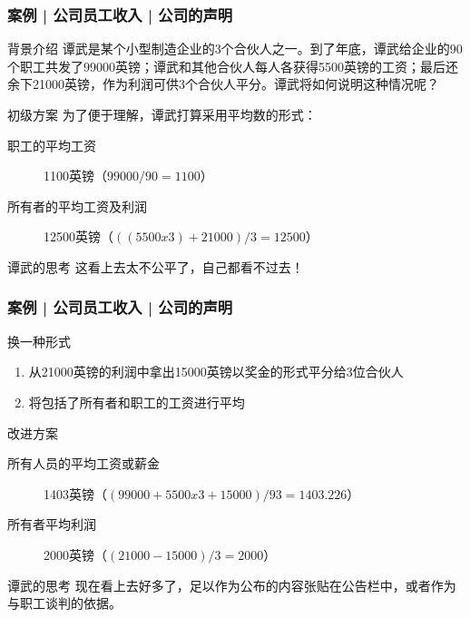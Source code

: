 \begin{frame}
  \frametitle{案例 | 公司员工收入 | 公司的声明}
  \begin{block}{背景介绍}
谭武是某个小型制造企业的3个合伙人之一。到了年底，谭武给企业的90个职工共发了99000英镑；谭武和其他合伙人每人各获得5500英镑的工资；最后还余下21000英镑，作为利润可供3个合伙人平分。谭武将如何说明这种情况呢？
  \end{block}
  \pause \pause \pause \pause
  \begin{block}{初级方案}
    为了便于理解，谭武打算采用平均数的形式：
    \begin{description}
      \item[职工的平均工资] 1100英镑（$99000 / 90 = 1100$）
      \item[所有者的平均工资及利润] 12500英镑（$((5500 x 3) + 21000) / 3 = 12500$）
    \end{description}
  \end{block}
  \pause
  \begin{block}{谭武的思考}
    这看上去太不公平了，自己都看不过去！
  \end{block}
\end{frame}

\begin{frame}
  \frametitle{案例 | 公司员工收入 | 公司的声明}
  \begin{block}{换一种形式}
    \begin{enumerate}
      \item 从21000英镑的利润中拿出15000英镑以奖金的形式平分给3位合伙人
      \item 将包括了所有者和职工的工资进行平均
    \end{enumerate}
  \end{block}
  \pause
  \begin{block}{改进方案}
    \begin{description}
      \item[所有人员的平均工资或薪金] 1403英镑（$(99000 + 5500 x 3 + 15000) / 93 = 1403.226$）
      \item[所有者平均利润] 2000英镑（$(21000 - 15000) / 3 = 2000$）
    \end{description}
  \end{block}
  \pause
  \begin{block}{谭武的思考}
    现在看上去好多了，足以作为公布的内容张贴在公告栏中，或者作为与职工谈判的依据。
  \end{block}
\end{frame}

